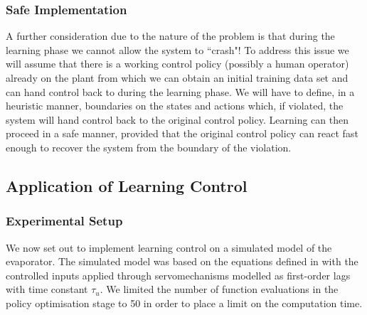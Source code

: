 \subsubsection{Safe Implementation}
A further consideration due to the nature of the problem is that during the learning phase we cannot allow the system to ``crash"! To address this issue we will assume that there is a working control policy (possibly a human operator) already on the plant from which we can obtain an initial training data set and can hand control back to during the learning phase. We will have to define, in a heuristic manner, boundaries on the states and actions which, if violated, the system will hand control back to the original control policy. Learning can then proceed in a safe manner, provided that the original control policy can react fast enough to recover the system from the boundary of the violation.





\subsection{Application of Learning Control}
\subsubsection{Experimental Setup}

We now set out to implement learning control on a simulated model of the evaporator. The simulated model was based on the equations defined in  with the controlled inputs applied through servomechanisms modelled as first-order lags with time constant $\tau_u$. We limited the number of function evaluations in the policy optimisation stage to 50 in order to place a limit on the computation time.

